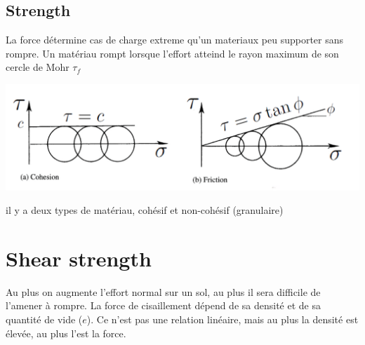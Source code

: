     \subsection{Strength}
    
        La force détermine cas de charge extreme qu'un materiaux peu supporter sans rompre. Un matériau rompt lorsque l'effort atteind le rayon maximum de son cercle de Mohr $\tau_f$ 
        
    \includegraphics[scale=0.5]{Verastegui/images/V9.PNG} 
        
        il y a deux types de matériau, cohésif et non-cohésif (granulaire)

\section{Shear strength}

    Au plus on augmente l'effort normal sur un sol, au plus il sera difficile de l'amener à rompre. La force de cisaillement dépend de sa densité et de sa quantité de vide ($e$). Ce n'est pas une relation linéaire, mais au plus la densité est élevée, au plus l'est la force.
    
